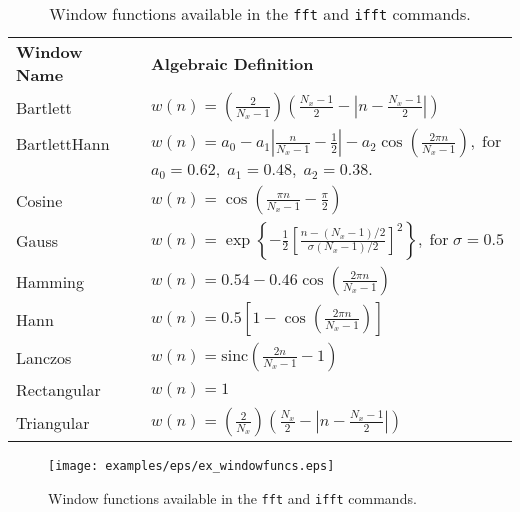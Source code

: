 \begin{table}
\newlength{\wfgap}
\setlength{\wfgap}{3mm}
\begin{tabular}{ll}
{\bf Window Name} & {\bf Algebraic Definition} \vspace{\wfgap}\\
Bartlett     & $\displaystyle w(n) = \left( \frac{2}{N_x-1} \right) \left( \frac{N_x-1}{2} - \left| n - \frac{N_x-1}{2} \right| \right)$ \vspace{\wfgap}\\
BartlettHann & $\displaystyle w(n) = a_0 - a_1\left|\frac{n}{N_x-1}-\frac{1}{2}\right| - a_2\cos\left(\frac{2\pi n}{N_x-1}\right),\;\textrm{for}$ \vspace{2mm}\\
             & $a_0=0.62,\; a_1=0.48,\; a_2=0.38.$ \vspace{\wfgap}\\
Cosine       & $\displaystyle w(n) = \cos\left(\frac{\pi n}{N_x-1} - \frac{\pi}{2} \right)$ \vspace{\wfgap}\\
Gauss        & $\displaystyle w(n) = \exp \left\{ -\frac{1}{2}\left[ \frac{n-(N_x-1)/2}{\sigma(N_x-1)/2} \right]^2 \right\},\;\textrm{for}\;\sigma=0.5$ \vspace{\wfgap}\\
Hamming      & $\displaystyle w(n) = 0.54 - 0.46\cos\left(\frac{2\pi n}{N_x-1}\right)$ \vspace{\wfgap}\\
Hann         & $\displaystyle w(n) = 0.5 \left[ 1 - \cos\left(\frac{2\pi n}{N_x-1}\right) \right]$ \vspace{\wfgap}\\
Lanczos      & $\displaystyle w(n) = \mathrm{sinc}\left( \frac{2n}{N_x-1} - 1 \right)$ \vspace{\wfgap}\\
Rectangular  & $\displaystyle w(n) = 1$ \vspace{\wfgap}\\
Triangular   & $\displaystyle w(n) = \left( \frac{2}{N_x} \right) \left( \frac{N_x}{2} - \left| n - \frac{N_x-1}{2} \right| \right)$ \vspace{\wfgap}\\
\end{tabular}
\caption{Window functions available in the {\tt fft} and {\tt ifft} commands.}
\label{tab:windowfuncs}
\end{table}

\begin{figure}
\begin{center}
\texttt{[image: examples/eps/ex\_windowfuncs.eps]}
\end{center}
\caption{Window functions available in the {\tt fft} and {\tt ifft} commands.}
\label{fig:windowfuncs}
\end{figure}

